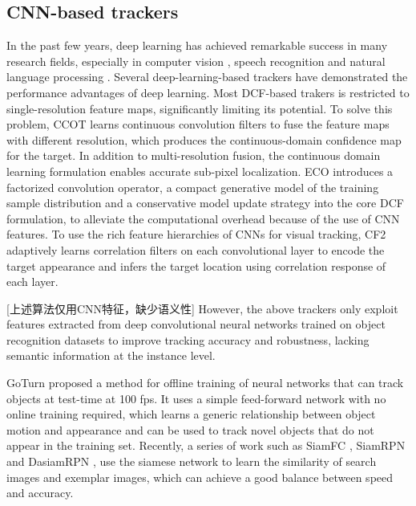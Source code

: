 \documentclass[review]{elsarticle}
\begin{document}
\begin{CJK*}{UTF8}{gbsn}
\subsection{CNN-based trackers}
In the past few years, deep learning \cite{Goodfellow2015DeepL} has achieved remarkable success in many research fields, especially in computer vision \cite{Girshick2016RegionBasedCN, Schroff2015FaceNetAU}, speech recognition \cite{Kim2016JointCB, Wu2015DeepNN} and natural language processing \cite{Vinyals2014GrammarAA, Bahdanau2014NeuralMT}. Several deep-learning-based trackers have demonstrated the performance advantages of deep learning. 
Most DCF-based trakers is restricted to single-resolution feature maps, significantly limiting its potential. To solve this problem, CCOT \cite{Danelljan2016BeyondCF} learns continuous convolution filters to fuse the feature maps with different resolution, which produces the continuous-domain confidence map for the target. In addition to multi-resolution fusion, the continuous domain learning formulation enables accurate sub-pixel localization.
ECO \cite{Danelljan2016ECOEC} introduces a factorized convolution operator, 
a compact generative model of the training sample distribution and a conservative model  update strategy into the core DCF formulation, to alleviate the computational overhead because of the use of CNN features.
To use the rich feature hierarchies of CNNs for visual tracking, CF2 \cite{Ma2015HierarchicalCF} adaptively learns correlation filters on each convolutional layer to encode the target appearance and infers the target location using correlation response of each layer.

[上述算法仅用CNN特征，缺少语义性] However, the above trackers only exploit features extracted from deep convolutional neural networks trained on object recognition datasets to improve tracking accuracy and robustness, lacking semantic information at the instance level.

GoTurn \cite{held2016learning} proposed a method for offline training of neural networks that can track objects at test-time at 100 fps. It uses a simple feed-forward network with no online training required, which learns a generic relationship between object motion and appearance and can be used to track novel objects that do not appear in the training set. 
Recently, a series of work such as SiamFC \cite{bertinetto2016fully}, SiamRPN \cite{Li2018HighPV} and DasiamRPN \cite{zhu2018distractor}, use the siamese network to learn the similarity of search images and exemplar images, which can achieve a good balance between speed and accuracy. 


\end{CJK*}
\end{document}
